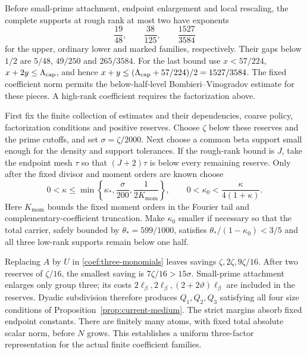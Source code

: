 Before small-prime attachment, endpoint enlargement and local rescaling,
the complete supports at rough rank at most two have exponents
\[
 \frac{19}{48},\qquad \frac{38}{125},\qquad
 \frac{1527}{3584}
\]
for the upper, ordinary lower and marked families, respectively.
Their gaps below $1/2$ are $5/48$, $49/250$ and $265/3584$.
For the last bound use $x<57/224$, $x+2y\le\Lambda_{\rm cap}$, and hence
$x+y\le(\Lambda_{\rm cap}+57/224)/2=1527/3584$.
The fixed coefficient norm permits the below-half-level
Bombieri--Vinogradov estimate for these pieces.  A high-rank coefficient
requires the factorization above.

First fix the finite collection of estimates and their dependencies, coarse policy, factorization conditions and
positive reserves.  Choose $\zeta$ below these reserves and the prime
cutoffs, and set $\sigma=\zeta/2000$.  Next choose a common beta support
small enough for the density and support tolerances.  If the rough-rank
bound is $J$, take the endpoint mesh $\tau$ so that $(J+2)\tau$ is below
every remaining reserve.  Only after the fixed divisor and moment orders
are known choose
\begin{equation}
 0<\kappa\le\min\left\{\kappa_*,\frac{\sigma}{200},
                         \frac1{2K_{\mathrm{mom}}}\right\},
 \qquad
 0<\kappa_0<\frac{\kappa}{4(1+\kappa)}.
 \label{coef:parameter-order}
\end{equation}
Here $K_{\mathrm{mom}}$ bounds the fixed moment orders in the Fourier
tail and complementary-coefficient truncation.  Make $\kappa_0$ smaller
if necessary so that the total carrier, safely bounded by
$\theta_*=599/1000$, satisfies $\theta_* /(1-\kappa_0)<3/5$ and all
three low-rank supports remain below one half.

Replacing $A$ by $U$ in \eqref{coef:three-monomials} leaves savings
$\zeta,2\zeta,9\zeta/16$.  After two reserves of $\zeta/16$, the
smallest saving is $7\zeta/16>15\sigma$.  Small-prime attachment enlarges
only group three; its costs $2\ell_\beta,2\ell_\beta,
(2+2\vartheta)\ell_\beta$ are included in the reserves.  Dyadic subdivision
therefore produces $Q_1,Q_2,Q_3$ satisfying all four size conditions of
Proposition~\ref{prop:current-medium}.  The strict margins absorb fixed
endpoint constants.  There are finitely many atoms, with fixed total
absolute scalar norm, before $N$ grows.  This establishes a uniform
three-factor representation for the actual finite coefficient families.

\hypertarget{coef:medium-checks}{}
